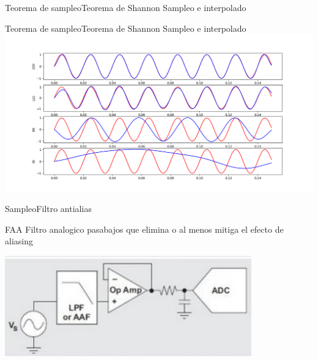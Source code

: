       \begin{frame}{Teorema de sampleo}{Teorema de Shannon}
         \handsonicon
         Sampleo e interpolado
         
         \vfill
      \end{frame}
      \begin{frame}{Teorema de sampleo}{Teorema de Shannon}
         \handsonicon
         Sampleo e interpolado
         \center\includegraphics[width=1.0\textwidth]{1_clase/teorema_sampleo_interpolado}
         \vfill
      \end{frame}
      \begin{frame}{Sampleo}{Filtro antialias}
         \begin{block}{FAA}
            Filtro \alert{analogico} pasabajos que elimina o al menos mitiga el efecto de aliasing
         \end{block}
         \center\includegraphics[width=0.8\textwidth]{1_clase/filtro_anti_aliasing}
         \vfill
      \end{frame}
